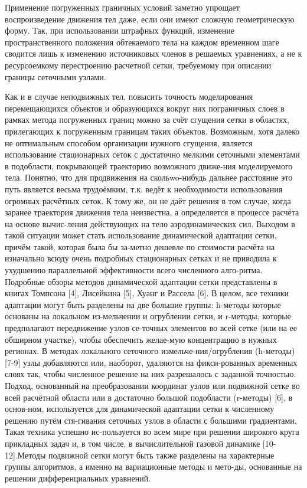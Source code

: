 	Применение погруженных граничных условий заметно упрощает воспроизведение движения тел даже, если они имеют сложную геометрическую форму. Так, при использовании штрафных функций, изменение пространственного положения обтекаемого тела на каждом временном шаге сводится лишь к изменению источниковых членов в решаемых уравнениях, а не к ресурсоемкому перестроению расчетной сетки, требуемому при описании границы сеточными узлами.

	Как и в случае неподвижных тел, повысить точность моделирования перемещающихся объектов и образующихся вокруг них пограничных слоев в рамках метода погруженных границ можно за счёт сгущения сетки в областях, прилегающих к погруженным границам таких объектов. Возможным, хотя далеко не оптимальным способом  организации нужного сгущения, является использование стационарных сеток с достаточно мелкими сеточными элементами в подобласти, покрывающей траекторию возможного движе-ния моделируемого тела. Понятно, что для продвижения на скольwo-нибудь дальнее расстояние это путь является весьма трудоёмким, т.к. ведёт к необходимости использования огромных расчётных сеток. К тому же, он не даёт решения в том случае, когда заранее траектория движения тела неизвестна, а определяется в процессе расчёта на основе вычис-ления действующих на тело аэродинамических сил. Выходом в такой ситуации может стать использование динамической адаптации сетки, причём такой, которая была бы за-метно дешевле по стоимости расчёта на изначально всюду очень подробных стационарных сетках и не приводила к ухудшению параллельной эффективности всего численного алго-ритма. 
Подробные обзоры методов динамической адаптации сетки представлены в книгах Томпсона [4], Лисейкина [5], Хуанг и Рассела [6]. В целом, все техники адаптации могут быть разделены на две большие группы: h-методы которые основаны на локальном из-мельчении и огрублении сетки, и r-методы, которые предполагают передвижение узлов се-точных элементов во всей сетке (или на ее обширном участке), чтобы обеспечить желае-мую концентрацию в нужных регионах. В методах локального сеточного измельче-ния/огрубления (h-методы) [7-9] узлы добавляются или, наоборот, удаляются на фикси-рованных временных слоях так, чтобы численное решение на них разрешалось с заданной точностью. Подход, основанный на преобразовании координат узлов или подвижной сетке во всей расчётной области или в достаточно большой подобласти (r-методы) [6], в основ-ном, используется для динамической адаптации сетки к численному решению путём стя-гивания сеточных узлов в области с большими градиентами. Такая техника успешно ис-пользуется во всем мире при решении широкого круга прикладных задач и, в том числе, в вычислительной газовой динамике [10-12].Методы подвижной сетки могут быть также разделены на характерные группы алгоритмов, а именно на вариационные методы и мето-ды, основанные на решении дифференциальных уравнений.
